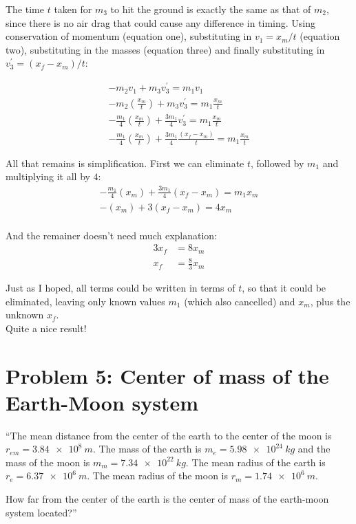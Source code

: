 \documentclass[12pt,a4paper]{report}
\begin{document}
The time $t$ taken for $m_3$ to hit the ground is exactly the same as that of $m_2$, since there is no air drag that could cause any difference in timing. Using conservation of momentum (equation one), substituting in $v_1 = x_m/t$ (equation two), substituting in the masses (equation three) and finally substituting in $v_3^{'} = (x_f - x_m)/t$:

\begin{align}
-m_2 v_1 + m_3 v_3^{'} = m_1 v_1\\
-m_2 (\frac{x_m}{t}) + m_3 v_3^{'} = m_1 \frac{x_m}{t}\\
-\frac{m_1}{4} (\frac{x_m}{t}) + \frac{3m_1}{4} v_3^{'} = m_1 \frac{x_m}{t}\\
-\frac{m_1}{4} (\frac{x_m}{t}) + \frac{3m_1}{4} \frac{(x_f - x_m)}{t} = m_1 \frac{x_m}{t}
\end{align}

All that remains is simplification. First we can eliminate $t$, followed by $m_1$ and multiplying it all by $4$:
\begin{align}
-\frac{m_1}{4} (x_m) + \frac{3m_1}{4} (x_f - x_m) = m_1 x_m\\
-(x_m) + 3 (x_f - x_m) = 4 x_m\\
\end{align}

And the remainer doesn't need much explanation:
\begin{align}
3 x_f &= 8 x_m\\
x_f &= \frac{8}{3} x_m
\end{align}

Just as I hoped, all terms could be written in terms of $t$, so that it could be eliminated, leaving only known values $m_1$ (which also cancelled) and $x_m$, plus the unknown $x_f$.\\
Quite a nice result!

\section{Problem 5: Center of mass of the Earth-Moon system}

``The mean distance from the center of the earth to the center of the moon is $r_{em} = \SI{3.84e8}{m}$. The mass of the earth is $m_e = \SI{5.98e24}{kg}$ and the mass of the moon is $m_m = \SI{7.34e22}{kg}$. The mean radius of the earth is $r_e = \SI{6.37e6}{m}$. The mean radius of the moon is $r_m = \SI{1.74e6}{m}$.

How far from the center of the earth is the center of mass of the earth-moon system located?''
\end{document}

